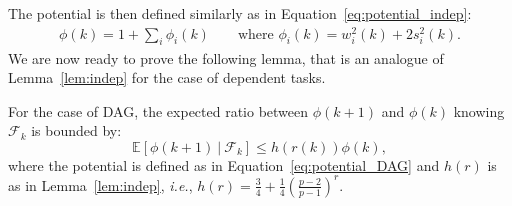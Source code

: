 The potential is then defined similarly as in
Equation~\eqref{eq:potential_indep}:
\begin{align}
  \label{eq:potential_DAG}
  \phi(k) = 1+ \sum_i \phi_i(k)\qquad\text{where }\phi_i(k)=w^2_i(k) + 2s^2_i(k).
\end{align}
We are now ready to prove the following lemma, that is an analogue of
Lemma~\ref{lem:indep} for the case of dependent tasks. 
\begin{lemma}\label{lem:DAG}
  For the case of DAG, the expected ratio between
  $\phi(k+1)$ and $\phi(k)$ knowing $\mathcal{F}_{k}$ is bounded by:
  \begin{equation*}
    \mathbb{E}[\phi(k+1) \:|\: \mathcal{F}_{k}] \leq
    h(r(k))\phi(k),
  \end{equation*}
  where the potential is defined as in
  Equation~\eqref{eq:potential_DAG} and $h(r)$ is as in
  Lemma~\ref{lem:indep}, \emph{i.e.}, 
  $h(r)=\frac34 + \frac14 \left(\frac{p-2}{p-1} \right)^{r}$.
\end{lemma}
